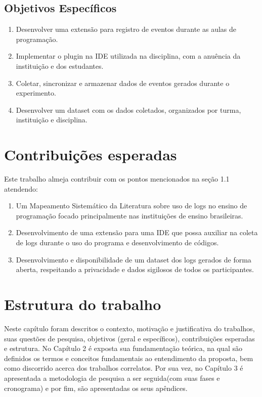 \subsection{Objetivos Específicos}\label{subsec:objetivos-especificos}
\begin{enumerate}
	\item Desenvolver uma extensão para registro de eventos durante 
    as aulas de programação.
	\item Implementar o plugin na IDE utilizada na disciplina, com 
    a anuência da instituição e dos estudantes.
	\item Coletar, sincronizar e armazenar dados de eventos gerados 
    durante o experimento.
	\item Desenvolver um dataset com os dados coletados, 
    organizados por turma, instituição e disciplina.
\end{enumerate}

\section{Contribuições esperadas}\label{sec:contribuicoes}

Este trabalho almeja contribuir com os pontos mencionados na seção 1.1 atendendo: 

\begin{enumerate}
    \item Um Mapeamento Sistemático da Literatura sobre uso de logs no ensino de programação focado 
    principalmente nas instituições de ensino brasileiras. 
     \item Desenvolvimento de uma extensão para uma IDE que possa auxiliar na coleta de logs durante o uso do 
     programa e desenvolvimento de códigos.
     \item Desenvolvimento e disponibilidade de um dataset dos logs gerados de forma aberta, respeitando a 
     privacidade e dados sigilosos de todos os participantes. 
\end{enumerate}
\section{Estrutura do trabalho}\label{sec:estrutura-trabalho}

Neste capítulo foram descritos o contexto, motivação e justificativa do trabalhos, suas questões de pesquisa, 
objetivos (geral e específicos), contribuições esperadas e estrutura. No Capítulo 2 é exposta sua fundamentação 
teórica, na qual são definidos os termos e conceitos fundamentais ao entendimento da proposta, bem como 
discorrido acerca dos trabalhos correlatos. Por sua vez, no Capítulo 3 é apresentada a metodologia de pesquisa 
a ser seguida(com suas fases e cronograma) e por fim, são apresentadas os seus apêndices. 